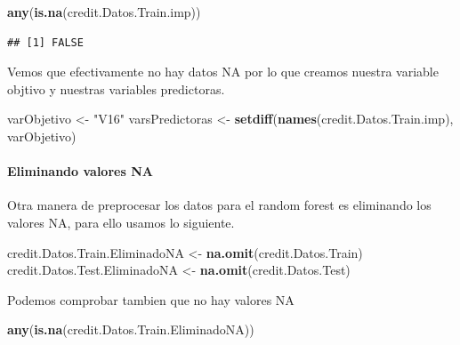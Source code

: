 \documentclass[
]{article}
\newenvironment{Shaded}{\begin{snugshade}}{\end{snugshade}}
\newcommand{\FunctionTok}[1]{\textcolor[rgb]{0.13,0.29,0.53}{\textbf{#1}}}
\newcommand{\NormalTok}[1]{#1}
\newcommand{\OtherTok}[1]{\textcolor[rgb]{0.56,0.35,0.01}{#1}}
\newcommand{\StringTok}[1]{\textcolor[rgb]{0.31,0.60,0.02}{#1}}
\begin{document}
\begin{Shaded}
\begin{Highlighting}[]
\FunctionTok{any}\NormalTok{(}\FunctionTok{is.na}\NormalTok{(credit.Datos.Train.imp))}
\end{Highlighting}
\end{Shaded}

\begin{verbatim}
## [1] FALSE
\end{verbatim}

Vemos que efectivamente no hay datos NA por lo que creamos nuestra
variable objtivo y nuestras variables predictoras.

\begin{Shaded}
\begin{Highlighting}[]
\NormalTok{varObjetivo }\OtherTok{\textless{}{-}} \StringTok{"V16"}
\NormalTok{varsPredictoras }\OtherTok{\textless{}{-}} \FunctionTok{setdiff}\NormalTok{(}\FunctionTok{names}\NormalTok{(credit.Datos.Train.imp), varObjetivo)}
\end{Highlighting}
\end{Shaded}

\hypertarget{eliminando-valores-na}{%
\paragraph{Eliminando valores NA}\label{eliminando-valores-na}}

Otra manera de preprocesar los datos para el random forest es eliminando
los valores NA, para ello usamos lo siguiente.

\begin{Shaded}
\begin{Highlighting}[]
\NormalTok{credit.Datos.Train.EliminadoNA }\OtherTok{\textless{}{-}} \FunctionTok{na.omit}\NormalTok{(credit.Datos.Train)}
\NormalTok{credit.Datos.Test.EliminadoNA }\OtherTok{\textless{}{-}} \FunctionTok{na.omit}\NormalTok{(credit.Datos.Test)}
\end{Highlighting}
\end{Shaded}

Podemos comprobar tambien que no hay valores NA

\begin{Shaded}
\begin{Highlighting}[]
\FunctionTok{any}\NormalTok{(}\FunctionTok{is.na}\NormalTok{(credit.Datos.Train.EliminadoNA))}
\end{Highlighting}
\end{Shaded}
\end{document}
